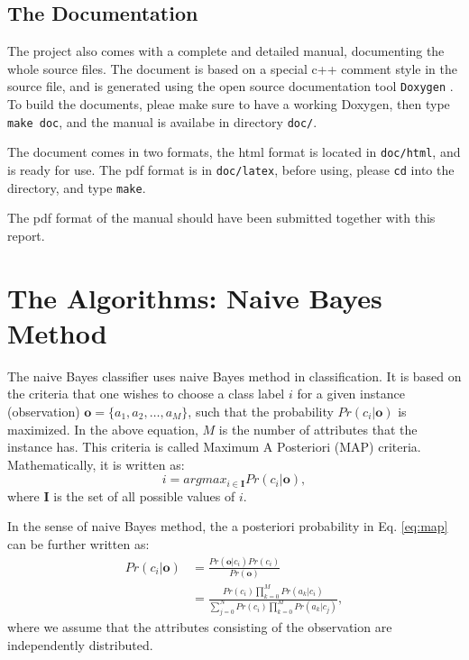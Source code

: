 \documentclass[a4paper,12pt]{article}
\begin{document}
\subsection{The Documentation}
The project also comes with a complete and detailed manual, documenting the whole source files. The document is based on a special c++ comment style in the source file, and is generated using the open source documentation tool \verb|Doxygen| \cite{doxygen}. To build the documents, pleae make sure to have a working Doxygen, then type \verb|make doc|, and the manual is availabe in directory \verb|doc/|. 

The document comes in two formats, the html format is located in \verb|doc/html|, and is ready for use. The pdf format is in \verb|doc/latex|, before using, please \verb|cd| into the directory, and type \verb|make|.

The pdf format of the manual should have been submitted together with this report.

\section{The Algorithms: Naive Bayes Method}
\label{sec:alg}
The naive Bayes classifier uses naive Bayes method in classification. It is based on the criteria that one wishes to choose a class label $i$ for a given instance (observation) $\mathbf{o}=\{a_1,a_2,\ldots,a_M\}$, such that the probability $Pr(c_i|\mathbf{o})$ is maximized. In the above equation, $M$ is the number of attributes that the instance has. This criteria is called Maximum A Posteriori (MAP) criteria. Mathematically, it is written as:
\begin{equation}
    \label{eq:map}
    i = argmax_{i \in \mathbf{I}} {Pr(c_i|\mathbf{o})},
\end{equation}
where $\mathbf{I}$ is the set of all possible values of $i$.

In the sense of naive Bayes method, the a posteriori probability in Eq. \ref{eq:map} can be further written as:
\begin{align}
    Pr(c_i|\mathbf{o}) & = \frac{Pr(\mathbf{o}|c_i)Pr(c_i)}{Pr(\mathbf{o})} \\
    & = \frac{ Pr(c_i) \prod_{k=0}^{M} { Pr(a_k|c_i) } } { \sum_{j=0}^{N} {Pr(c_i) \prod_{k=0}^{M}{Pr(a_k|c_j)} }},
\end{align}
where we assume that the attributes consisting of the observation are independently distributed.
\end{document}
